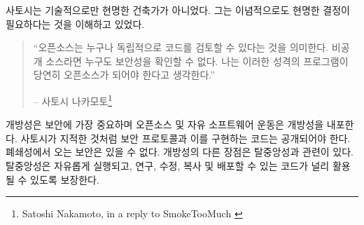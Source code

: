 \begin{comment}
Satoshi wasn't only a wise builder technologically. He also understood
that it would be necessary to make wise decisions ideologically.
\end{comment}
사토시는 기술적으로만 현명한 건축가가 아니었다.
그는 이념적으로도 현명한 결정이 필요하다는 것을 이해하고 있었다.

\begin{quotation}\begin{samepage}
\begin{comment}
\enquote{Being open source means anyone can independently review the code. If
it was closed source, nobody could verify the security. I think it's
essential for a program of this nature to be open source.}
\begin{flushright} -- Satoshi Nakamoto\footnote{Satoshi Nakamoto, in a reply to SmokeTooMuch \cite{satoshi-open-source}}
\end{comment}
\enquote{오픈소스는 누구나 독립적으로 코드를 검토할 수 있다는 것을 의미한다.
비공개 소스라면 누구도 보안성을 확인할 수 없다. 
나는 이러한 성격의 프로그램이 당연히 오픈소스가 되어야 한다고 생각한다.}
\begin{flushright} -- 사토시 나카모토\footnote{Satoshi Nakamoto, in a reply to SmokeTooMuch \cite{satoshi-open-source}}
\end{flushright}\end{samepage}\end{quotation}

\begin{comment}
Openness is paramount to security and inherent in open source and the
free software movement. As Satoshi pointed out, secure protocols and the
code which implements them have to be open --- there is no security
through obscurity. Another benefit is again related to decentralization:
code which can be run, studied, modified, copied, and distributed freely
ensures that it is spread far and wide.
\end{comment}
개방성은 보안에 가장 중요하며 오픈소스 및 자유 소프트웨어 운동은 개방성을 내포한다.
사토시가 지적한 것처럼 보안 프로토콜과 이를 구현하는 코드는 공개되어야 한다.
폐쇄성에서 오는 보안은 있을 수 없다.
개방성의 다른 장점은 탈중앙성과 관련이 있다.
탈중앙성은 자유롭게 실행되고, 연구, 수정, 복사 및 배포할 수 있는 코드가 널리 활용될 수 있도록 보장한다.


